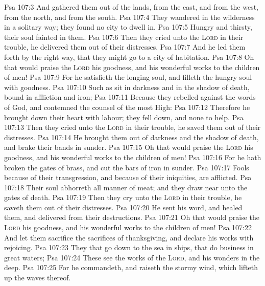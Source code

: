 \vs Psa 107:3 And gathered them out of the lands, from the east, and from the west, from the north, and from the south.
\vs Psa 107:4 They wandered in the wilderness in a solitary way; they found no city to dwell in.
\vs Psa 107:5 Hungry and thirsty, their soul fainted in them.
\vs Psa 107:6 Then they cried unto the \textsc{Lord} in their trouble,  he delivered them out of their distresses.
\vs Psa 107:7 And he led them forth by the right way, that they might go to a city of habitation.
\vs Psa 107:8 Oh that  would praise the \textsc{Lord}  his goodness, and  his wonderful works to the children of men!
\vs Psa 107:9 For he satisfieth the longing soul, and filleth the hungry soul with goodness.
\vs Psa 107:10 Such as sit in darkness and in the shadow of death,  bound in affliction and iron;
\vs Psa 107:11 Because they rebelled against the words of God, and contemned the counsel of the most High:
\vs Psa 107:12 Therefore he brought down their heart with labour; they fell down, and  none to help.
\vs Psa 107:13 Then they cried unto the \textsc{Lord} in their trouble,  he saved them out of their distresses.
\vs Psa 107:14 He brought them out of darkness and the shadow of death, and brake their bands in sunder.
\vs Psa 107:15 Oh that  would praise the \textsc{Lord}  his goodness, and  his wonderful works to the children of men!
\vs Psa 107:16 For he hath broken the gates of brass, and cut the bars of iron in sunder.
\vs Psa 107:17 Fools because of their transgression, and because of their iniquities, are afflicted.
\vs Psa 107:18 Their soul abhorreth all manner of meat; and they draw near unto the gates of death.
\vs Psa 107:19 Then they cry unto the \textsc{Lord} in their trouble,  he saveth them out of their distresses.
\vs Psa 107:20 He sent his word, and healed them, and delivered  from their destructions.
\vs Psa 107:21 Oh that  would praise the \textsc{Lord}  his goodness, and  his wonderful works to the children of men!
\vs Psa 107:22 And let them sacrifice the sacrifices of thanksgiving, and declare his works with rejoicing.
\vs Psa 107:23 They that go down to the sea in ships, that do business in great waters;
\vs Psa 107:24 These see the works of the \textsc{Lord}, and his wonders in the deep.
\vs Psa 107:25 For he commandeth, and raiseth the stormy wind, which lifteth up the waves thereof.
